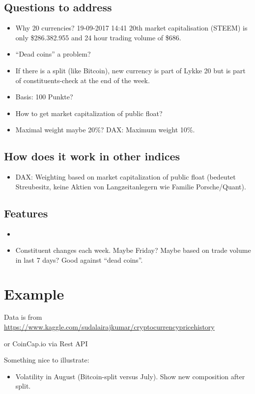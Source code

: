 \documentclass[11pt]{article}
\begin{document}
\subsection{Questions to address}
\begin{itemize}
  \item Why 20 currencies? 19-09-2017 14:41 20th market capitalisation (STEEM) is only \$286.382.955	and 24 hour trading volume of \$686.
  \item ``Dead coins'' a problem?
  \item If there is a split (like Bitcoin), new currency is part of Lykke 20 but is part of constituents-check at the end of the week.
  \item Basis: 100 Punkte?
  \item How to get market capitalization of public float?
  \item Maximal weight maybe 20\%? DAX: Maximum weight 10\%.
\end{itemize}

\subsection{How does it work in other indices}

\begin{itemize}
  \item DAX: Weighting based on market capitalization of public float (bedeutet Streubesitz, keine Aktien von Langzeitanlegern  wie Familie Porsche/Quant).
\end{itemize}

\subsection{Features}

\begin{itemize}
  \item 
  \item Constituent changes each week. Maybe Friday? Maybe based on trade volume in last 7 days? Good against ``dead coins''.
\end{itemize}


\section{Example}

Data is from \href{https://www.kaggle.com/sudalairajkumar/cryptocurrencypricehistory}{https://www.kaggle.com/sudalairajkumar/cryptocurrencypricehistory}

or CoinCap.io via Rest API

Something nice to illustrate:
\begin{itemize}
  \item Volatility in August (Bitcoin-split versus July). Show new composition after split.
\end{itemize}
\end{document}
